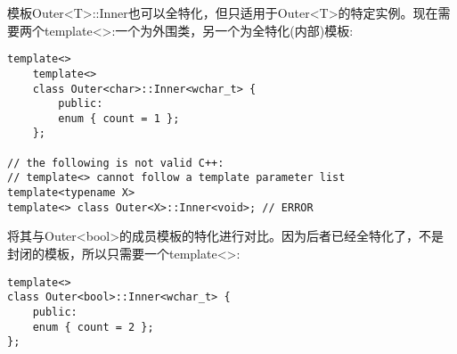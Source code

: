 模板Outer<T>::Inner也可以全特化，但只适用于Outer<T>的特定实例。现在需要两个template<>:一个为外围类，另一个为全特化(内部)模板:

\begin{lstlisting}[style=styleCXX]
template<>
	template<>
	class Outer<char>::Inner<wchar_t> {
		public:
		enum { count = 1 };
	};

// the following is not valid C++:
// template<> cannot follow a template parameter list
template<typename X>
template<> class Outer<X>::Inner<void>; // ERROR
\end{lstlisting}

将其与Outer<bool>的成员模板的特化进行对比。因为后者已经全特化了，不是封闭的模板，所以只需要一个template<>:

\begin{lstlisting}[style=styleCXX]
template<>
class Outer<bool>::Inner<wchar_t> {
	public:
	enum { count = 2 };
};
\end{lstlisting}
































